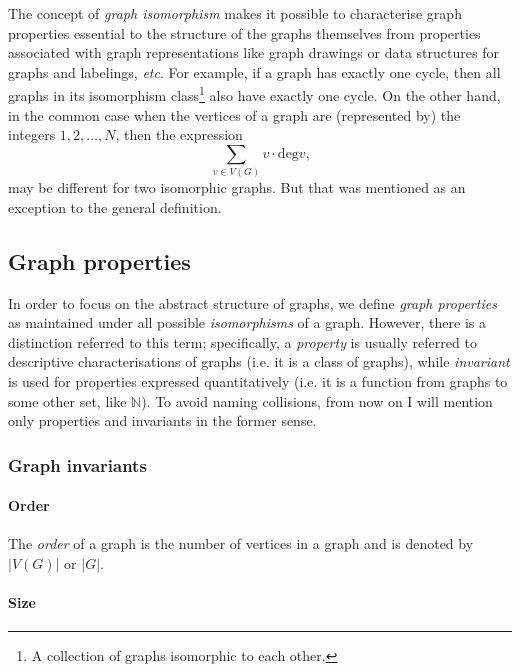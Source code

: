       The concept of \emph{graph isomorphism} makes it possible to characterise graph properties essential to the structure of the graphs themselves from properties associated with graph representations like graph drawings or data structures for graphs and labelings, \emph{etc}. For example, if a graph has exactly one cycle, then all graphs in its isomorphism class\footnote{A collection of graphs isomorphic to each other.} also have exactly one cycle. On the other hand, in the common case when the vertices of a graph are (represented by) the integers $1, 2, \ldots, N$, then the expression
      \begin{equation}
        \sum_{v \in V(G)} v\cdot\mbox{deg} v\mbox{,}
      \end{equation}
      may be different for two isomorphic graphs. But that was mentioned as an exception to the general definition.

    \subsection{Graph properties}

      In order to focus on the abstract structure of graphs, we define \emph{graph properties} as maintained under all possible \emph{isomorphisms} of a graph. However, there is a distinction referred to this term; specifically, a \emph{property} is usually referred to descriptive characterisations of graphs (i.e. it is a class of graphs), while \emph{invariant} is used for properties expressed quantitatively (i.e. it is a function from graphs to some other set, like $\mathbb{N}$). To avoid naming collisions, from now on I will mention only properties and invariants in the former sense. 

      \subsubsection{Graph invariants}

        \paragraph{Order}

          The \emph{order} of a graph is the number of vertices in a graph and is denoted by $|V(G)|$ or $|G|$.
            
        \paragraph{Size}

